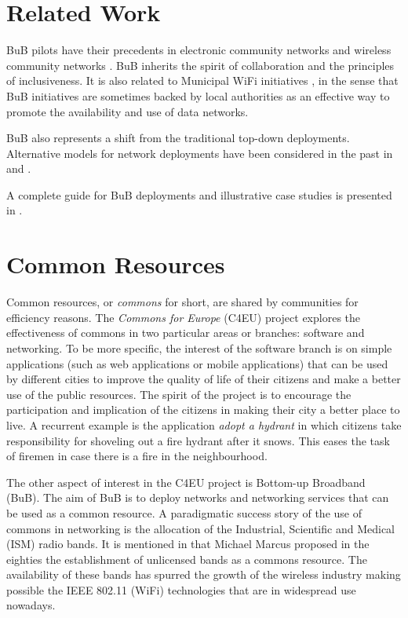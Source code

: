 \documentclass[conference]{IEEEtran}
\begin{document}
\section{Related Work}

BuB pilots have their precedents in electronic community networks \cite{schuler1994cnb} and wireless community networks \cite{flickenger2001wcn,jain2003wcn}.
BuB inherits the spirit of collaboration and the principles of inclusiveness.
It is also related to Municipal WiFi initiatives \cite{jassem2010mwc}, in the sense that BuB initiatives are sometimes backed by local authorities as an effective way to promote the availability and use of data networks.

BuB also represents a shift from the traditional top-down deployments.
Alternative models for network deployments have been considered in the past in \cite{barcelo2008wom} and \cite{seraghiti2010upw}.

A complete guide for BuB deployments and illustrative case studies is presented in \cite{aichele2006wnd}.

\section{Common Resources}
\label{sec:commons}
Common resources, or \emph{commons} for short, are shared by communities for efficiency reasons.
The \emph{Commons for Europe} (C4EU) project explores the effectiveness of commons in two particular areas or branches: software and networking.
To be more specific, the interest of the software branch is on simple applications (such as web applications or mobile applications) that can be used by different cities to improve the quality of life of their citizens and make a better use of the public resources.
The spirit of the project is to encourage the participation and implication of the citizens in making their city a better place to live.
A recurrent example is the application \emph{adopt a hydrant} in which citizens take responsibility for shoveling out a fire hydrant after it snows.
This eases the task of firemen in case there is a fire in the neighbourhood.

The other aspect of interest in the C4EU project is Bottom-up Broadband (BuB).
The aim of BuB is to deploy networks and networking services that can be used as a common resource.
A paradigmatic success story of the use of commons in networking is the allocation of the Industrial, Scientific and Medical (ISM) radio bands.
It is mentioned in \cite{abramson2009asw} that Michael Marcus proposed in the eighties the establishment of unlicensed bands as a commons resource.
The availability of these bands has spurred the growth of the wireless industry making possible the IEEE 802.11 (WiFi) technologies that are in widespread use nowadays.
\end{document}
